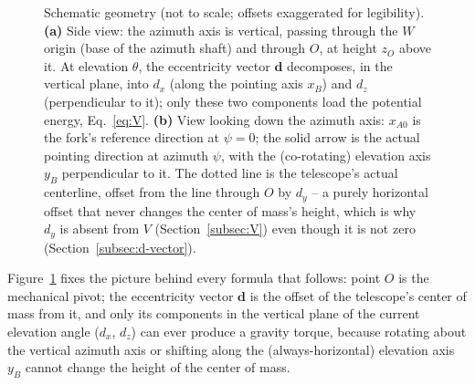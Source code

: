 \documentclass[11pt,a4paper]{article}
\numberwithin{equation}{section}
\newcommand{\bs}[1]{\boldsymbol{#1}}
\begin{document}
\begin{figure}[htbp]
\caption{Schematic geometry (not to scale; offsets exaggerated for legibility). \textbf{(a)} Side view: the azimuth axis is vertical, passing through the $W$ origin (base of the azimuth shaft) and through $O$, at height $z_O$ above it. At elevation $\theta$, the eccentricity vector $\bs d$ decomposes, in the vertical plane, into $d_x$ (along the pointing axis $x_B$) and $d_z$ (perpendicular to it); only these two components load the potential energy, Eq.~\eqref{eq:V}. \textbf{(b)} View looking down the azimuth axis: $x_{A0}$ is the fork's reference direction at $\psi=0$; the solid arrow is the actual pointing direction at azimuth $\psi$, with the (co-rotating) elevation axis $y_B$ perpendicular to it. The dotted line is the telescope's actual centerline, offset from the line through $O$ by $d_y$ -- a purely horizontal offset that never changes the center of mass's height, which is why $d_y$ is absent from $V$ (Section~\ref{subsec:V}) even though it is not zero (Section~\ref{subsec:d-vector}).}
\label{fig:geometria}
\end{figure}

Figure~\ref{fig:geometria} fixes the picture behind every formula that follows: point $O$ is the mechanical pivot; the eccentricity vector $\bs d$ is the offset of the telescope's center of mass from it, and only its components in the vertical plane of the current elevation angle ($d_x$, $d_z$) can ever produce a gravity torque, because rotating about the vertical azimuth axis or shifting along the (always-horizontal) elevation axis $y_B$ cannot change the height of the center of mass.
\end{document}
